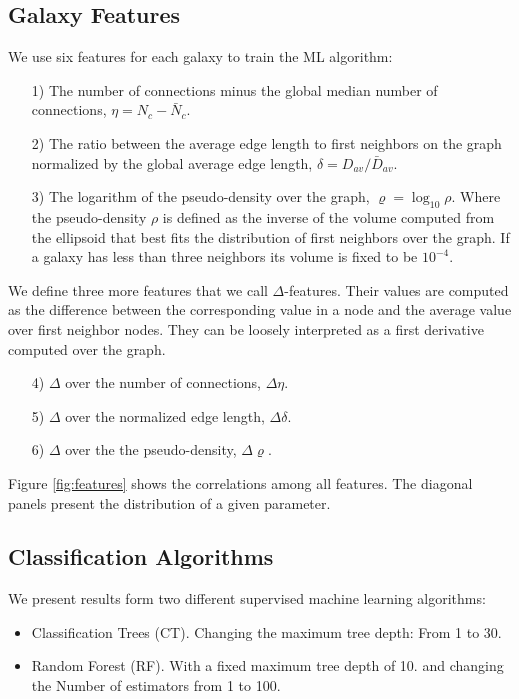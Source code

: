 \documentclass[usenatbib]{mnras}
\begin{document}
\subsection{Galaxy Features}

We use six features for each galaxy to train the ML algorithm:
\begin{enumerate}
\item[1)]
The number of connections minus the global median number of
connections, $\eta = N_c - \bar{N}_c$. 
\item[2)]
The ratio between the average edge length to first neighbors on the graph
normalized by the global average edge length, $\delta=D_{av}/\bar{D}_{av}$. 
\item[3)] 
The logarithm of the pseudo-density over the graph,
  $\varrho=\log_{10}\rho$.   
Where the pseudo-density $\rho$ is defined as the inverse of the volume
computed from the ellipsoid that best fits the distribution of first
neighbors over the graph. 
If a galaxy has less than three neighbors its volume is fixed to be $10^{-4}$.
\end{enumerate}
\noindent
We define three more features that we call $\Delta$-features.
Their values are computed as the difference between the corresponding
value in a node and the average value over first neighbor nodes.  
They can be loosely interpreted as a first derivative computed over the graph. 

\begin{enumerate}
\item[4)] $\Delta$ over the number of connections, $\Delta\eta$.
\item[5)] $\Delta$ over the normalized edge length, $\Delta\delta$.
\item[6)] $\Delta$ over the the pseudo-density, $\Delta\varrho$.
\end{enumerate}

Figure \ref{fig:features} shows the correlations among all features.
The diagonal panels present the distribution of a given parameter.



\subsection{Classification Algorithms}

We present results form two different supervised machine learning algorithms:

\begin{itemize}
    \item Classification Trees (CT). Changing the maximum tree depth: From 1 to 30.
    \item Random Forest (RF). With a fixed maximum tree depth of 10.
            and changing the Number of estimators from 1 to 100.
\end{itemize}
\end{document}
